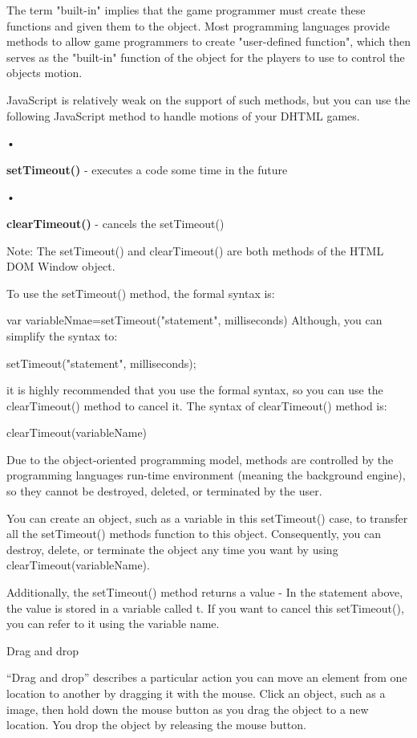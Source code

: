 \documentclass[
]{article}
\begin{document}
The term "built-in" implies that the game programmer must create these
functions and given them to the object. Most programming languages
provide methods to allow game programmers to create "user-defined
function", which then serves as the "built-in" function of the object
for the players to use to control the object\textquotesingle s motion.

JavaScript is relatively weak on the support of such methods, but you
can use the following JavaScript method to handle motions of your DHTML
games.

•

\textbf{setTimeout()} - executes a code some time in the future

•

\textbf{clearTimeout()} - cancels the setTimeout()

Note: The setTimeout() and clearTimeout() are both methods of the HTML
DOM Window object.

To use the setTimeout() method, the formal syntax is:

var variableNmae=setTimeout("statement", milliseconds) Although, you can
simplify the syntax to:

setTimeout("statement", milliseconds);

it is highly recommended that you use the formal syntax, so you can use
the clearTimeout() method to cancel it. The syntax of clearTimeout()
method is:

clearTimeout(variableName)

Due to the object-oriented programming model, methods are controlled by
the programming language\textquotesingle s run-time environment (meaning
the background engine), so they cannot be destroyed, deleted, or
terminated by the user.

You can create an object, such as a variable in this setTimeout() case,
to transfer all the setTimeout() method\textquotesingle s function to
this object. Consequently, you can destroy, delete, or terminate the
object any time you want by using clearTimeout(variableName).

Additionally, the setTimeout() method returns a value - In the statement
above, the value is stored in a variable called t. If you want to cancel
this setTimeout(), you can refer to it using the variable name.

Drag and drop

``Drag and drop'' describes a particular action you can move an element
from one location to another by dragging it with the mouse. Click an
object, such as a image, then hold down the mouse button as you drag the
object to a new location. You drop the object by releasing the mouse
button.
\end{document}
